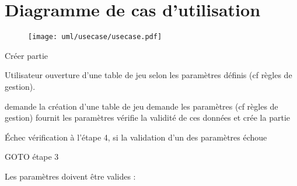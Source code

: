 
\minitoc
\clearpage

\section*{Diagramme de cas d'utilisation}\vspace{3em}
\begin{figure}[h]
	\centering \texttt{[image: uml/usecase/usecase.pdf]}
\end{figure}
\clearpage


\begin{usecase}{Créer partie}
	
	\begin{presentation}
		\actor Utilisateur
		\goal ouverture d'une table de jeu selon les paramètres définis 
		      (cf règles de gestion).
		
		\begin{precondition}
			\aucune
		\end{precondition}
		
		\begin{postcondition}
			\aucune
		\end{postcondition}
		
		\begin{includeuc}
			\aucun
		\end{includeuc}
	\end{presentation}
	
	\begin{scenario}
		\start demande la création d'une table de jeu
			\system demande les paramètres (cf règles de gestion)
		\user fournit les paramètres
			\system vérifie la validité de ces données et crée la partie
	\end{scenario}
	
	\begin{alternative}
		\nomalt Échec vérification
			\condition à l'étape 4, si la validation d'un des paramètres échoue
			
			\begin{alt}
				\item GOTO étape 3
			\end{alt}
	\end{alternative}
	
	\begin{regles}
		\nom Les paramètres doivent être valides  :
		

\end{regles}
\end{usecase}
